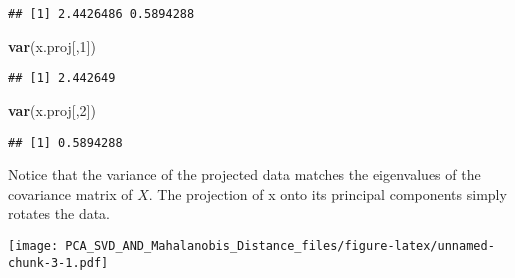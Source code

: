 \documentclass[]{article}
\newenvironment{Shaded}{\begin{snugshade}}{\end{snugshade}}
\newcommand{\KeywordTok}[1]{\textcolor[rgb]{0.13,0.29,0.53}{\textbf{{#1}}}}
\newcommand{\DataTypeTok}[1]{\textcolor[rgb]{0.13,0.29,0.53}{{#1}}}
\newcommand{\DecValTok}[1]{\textcolor[rgb]{0.00,0.00,0.81}{{#1}}}
\newcommand{\FloatTok}[1]{\textcolor[rgb]{0.00,0.00,0.81}{{#1}}}
\newcommand{\StringTok}[1]{\textcolor[rgb]{0.31,0.60,0.02}{{#1}}}
\newcommand{\OtherTok}[1]{\textcolor[rgb]{0.56,0.35,0.01}{{#1}}}
\newcommand{\NormalTok}[1]{{#1}}
\begin{document}
\begin{verbatim}
## [1] 2.4426486 0.5894288
\end{verbatim}

\begin{Shaded}
\begin{Highlighting}[]
\KeywordTok{var}\NormalTok{(x.proj[,}\DecValTok{1}\NormalTok{])}
\end{Highlighting}
\end{Shaded}

\begin{verbatim}
## [1] 2.442649
\end{verbatim}

\begin{Shaded}
\begin{Highlighting}[]
\KeywordTok{var}\NormalTok{(x.proj[,}\DecValTok{2}\NormalTok{])}
\end{Highlighting}
\end{Shaded}

\begin{verbatim}
## [1] 0.5894288
\end{verbatim}

Notice that the variance of the projected data matches the eigenvalues
of the covariance matrix of \(X\). The projection of x onto its
principal components simply rotates the data.

\begin{Shaded}
\end{Shaded}

\texttt{[image: PCA\_SVD\_AND\_Mahalanobis\_Distance\_files/figure-latex/unnamed-chunk-3-1.pdf]}
\end{document}
